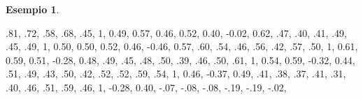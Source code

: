 \documentclass[
  11pt,
]{krantz}
\makeatletter
\newenvironment{Shaded}{\begin{snugshade}}{\end{snugshade}}
\newcommand{\DecValTok}[1]{\textcolor[rgb]{0.06,0.06,0.06}{#1}}
\newcommand{\FloatTok}[1]{\textcolor[rgb]{0.06,0.06,0.06}{#1}}
\newcommand{\NormalTok}[1]{#1}
\newcommand{\SpecialCharTok}[1]{\textcolor[rgb]{0,0,0}{#1}}
\newenvironment{kframe}{%
\medskip{}
\setlength{\fboxsep}{.8em}
 \def\at@end@of@kframe{}%
 \ifinner\ifhmode%
  \def\at@end@of@kframe{\end{minipage}}%
  \begin{minipage}{\columnwidth}%
 \fi\fi%
 \def\FrameCommand##1{\hskip\@totalleftmargin \hskip-\fboxsep
 \colorbox{shadecolor}{##1}\hskip-\fboxsep
     \hskip-\linewidth \hskip-\@totalleftmargin \hskip\columnwidth}%
 \MakeFramed {\advance\hsize-\width
   \@totalleftmargin\z@ \linewidth\hsize
   \@setminipage}}%
 {\par\unskip\endMakeFramed%
 \at@end@of@kframe}
\renewenvironment{Shaded}{\begin{kframe}}{\end{kframe}}
\theoremstyle{definition}
\theoremstyle{definition}
\newtheorem{example}{Esempio}[chapter]
\theoremstyle{definition}
\theoremstyle{definition}
\theoremstyle{remark}
\makeatother
\begin{document}
\begin{example}
\begin{Shaded}
\begin{Highlighting}[]
\NormalTok{  .}\DecValTok{81}\NormalTok{, .}\DecValTok{72}\NormalTok{, .}\DecValTok{58}\NormalTok{, .}\DecValTok{68}\NormalTok{, .}\DecValTok{45}\NormalTok{, }\DecValTok{1}\NormalTok{, }\FloatTok{0.49}\NormalTok{, }\FloatTok{0.57}\NormalTok{, }\FloatTok{0.46}\NormalTok{, }\FloatTok{0.52}\NormalTok{, }\FloatTok{0.40}\NormalTok{, }\SpecialCharTok{{-}}\FloatTok{0.02}\NormalTok{,}
  \FloatTok{0.62}\NormalTok{, .}\DecValTok{47}\NormalTok{, .}\DecValTok{40}\NormalTok{, .}\DecValTok{41}\NormalTok{, .}\DecValTok{49}\NormalTok{, .}\DecValTok{45}\NormalTok{, .}\DecValTok{49}\NormalTok{, }\DecValTok{1}\NormalTok{, }\FloatTok{0.50}\NormalTok{, }\FloatTok{0.50}\NormalTok{, }\FloatTok{0.52}\NormalTok{, }\FloatTok{0.46}\NormalTok{,}
  \SpecialCharTok{{-}}\FloatTok{0.46}\NormalTok{, }\FloatTok{0.57}\NormalTok{, .}\DecValTok{60}\NormalTok{, .}\DecValTok{54}\NormalTok{, .}\DecValTok{46}\NormalTok{, .}\DecValTok{56}\NormalTok{, .}\DecValTok{42}\NormalTok{, .}\DecValTok{57}\NormalTok{, .}\DecValTok{50}\NormalTok{, }\DecValTok{1}\NormalTok{, }\FloatTok{0.61}\NormalTok{, }\FloatTok{0.59}\NormalTok{,}
  \FloatTok{0.51}\NormalTok{, }\SpecialCharTok{{-}}\FloatTok{0.28}\NormalTok{, }\FloatTok{0.48}\NormalTok{, .}\DecValTok{49}\NormalTok{, .}\DecValTok{45}\NormalTok{, .}\DecValTok{48}\NormalTok{, .}\DecValTok{50}\NormalTok{, .}\DecValTok{39}\NormalTok{, .}\DecValTok{46}\NormalTok{, .}\DecValTok{50}\NormalTok{, .}\DecValTok{61}\NormalTok{, }\DecValTok{1}\NormalTok{,}
  \FloatTok{0.54}\NormalTok{, }\FloatTok{0.59}\NormalTok{, }\SpecialCharTok{{-}}\FloatTok{0.32}\NormalTok{, }\FloatTok{0.44}\NormalTok{, .}\DecValTok{51}\NormalTok{, .}\DecValTok{49}\NormalTok{, .}\DecValTok{43}\NormalTok{, .}\DecValTok{50}\NormalTok{, .}\DecValTok{42}\NormalTok{, .}\DecValTok{52}\NormalTok{, .}\DecValTok{52}\NormalTok{, .}\DecValTok{59}\NormalTok{,}
\NormalTok{  .}\DecValTok{54}\NormalTok{, }\DecValTok{1}\NormalTok{, }\FloatTok{0.46}\NormalTok{, }\SpecialCharTok{{-}}\FloatTok{0.37}\NormalTok{, }\FloatTok{0.49}\NormalTok{, .}\DecValTok{41}\NormalTok{, .}\DecValTok{38}\NormalTok{, .}\DecValTok{37}\NormalTok{, .}\DecValTok{41}\NormalTok{, .}\DecValTok{31}\NormalTok{, .}\DecValTok{40}\NormalTok{, .}\DecValTok{46}\NormalTok{, .}\DecValTok{51}\NormalTok{,}
\NormalTok{  .}\DecValTok{59}\NormalTok{, .}\DecValTok{46}\NormalTok{, }\DecValTok{1}\NormalTok{, }\SpecialCharTok{{-}}\FloatTok{0.28}\NormalTok{, }\FloatTok{0.40}\NormalTok{, }\SpecialCharTok{{-}}\NormalTok{.}\DecValTok{07}\NormalTok{, }\SpecialCharTok{{-}}\NormalTok{.}\DecValTok{08}\NormalTok{, }\SpecialCharTok{{-}}\NormalTok{.}\DecValTok{08}\NormalTok{, }\SpecialCharTok{{-}}\NormalTok{.}\DecValTok{19}\NormalTok{, }\SpecialCharTok{{-}}\NormalTok{.}\DecValTok{19}\NormalTok{, }\SpecialCharTok{{-}}\NormalTok{.}\DecValTok{02}\NormalTok{,}

\end{Highlighting}
\end{Shaded}
\end{example}
\end{document}

